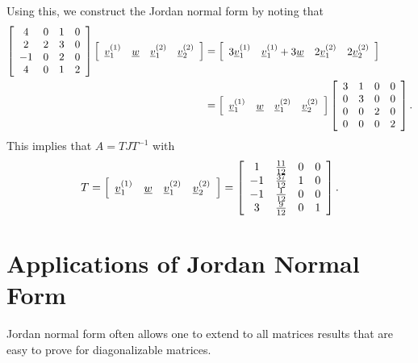 \begin{example}
Using this, we construct the Jordan normal form by noting that
\begin{align*}
\left[ \begin{array}{cccc} 4 & 0 & 1 & 0 \\ 2 & 2 & 3 & 0 \\ -1 & 0 & 2 & 0 \\ 4 & 0 & 1 & 2 \end{array} \right]
\left[ \begin{array}{cccc} \underline{v}_1^{(1)} & \underline{w} & \underline{v}_1^{(2)} & \underline{v}_2^{(2)} \end{array} \right]
& = \left[ \begin{array}{cccc} 3 \underline{v}_1^{(1)} & \underline{v}_1^{(1)}+3 \underline{w} & 2 \underline{v}_1^{(2)} & 2 \underline{v}_2^{(2)} \end{array} \right] \\
& = \left[ \begin{array}{cccc} \underline{v}_1^{(1)} & \underline{w} & \underline{v}_1^{(2)} & \underline{v}_2^{(2)} \end{array} \right]
\left[ \begin{array}{cccc} 3 & 1 & 0 & 0 \\ 0 & 3 & 0 & 0 \\ 0 & 0 & 2 & 0 \\ 0 & 0 & 0 & 2 \end{array} \right].
\end{align*}
This implies that $A = T J T^{-1}$ with
\begin{equation*}
T = \left[ \begin{array}{cccc} \underline{v}_1^{(1)} & \underline{w} & \underline{v}_1^{(2)} & \underline{v}_2^{(2)} \end{array} \right]
 = \left[ \begin{array}{cccc} 1 & \frac{11}{12} & 0 & 0 \\ -1 & \frac{37}{12} & 1 & 0 \\ -1 & \frac{1}{12} & 0 & 0 \\ 3 & \frac{9}{12} & 0 & 1 \end{array} \right].
\end{equation*}
\end{example}

\section{Applications of Jordan Normal Form}

Jordan normal form often allows one to extend to all matrices results that are easy to prove for diagonalizable matrices.

